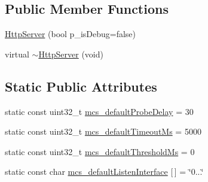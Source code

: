 \subsection*{Public Member Functions}
\begin{DoxyCompactItemize}
\item 
\hyperlink{classxtd_1_1servers_1_1app_1_1HttpServer_a3ebbe8af998a3e3738e41a72375ffea9}{Http\-Server} (bool p\-\_\-is\-Debug=false)
\item 
virtual \hyperlink{classxtd_1_1servers_1_1app_1_1HttpServer_a1082944f193865fc303c2d4a5569eaf9}{$\sim$\-Http\-Server} (void)
\end{DoxyCompactItemize}
\subsection*{Static Public Attributes}
\begin{DoxyCompactItemize}
\item 
static const uint32\-\_\-t \hyperlink{classxtd_1_1servers_1_1app_1_1HttpServer_a9ca36e61f5c201a51a68b3919e0badb7}{mcs\-\_\-default\-Probe\-Delay} = 30
\item 
static const uint32\-\_\-t \hyperlink{classxtd_1_1servers_1_1app_1_1HttpServer_abdc02697ffc7fa9f8f88252101b5d1b9}{mcs\-\_\-default\-Timeout\-Ms} = 5000
\item 
static const uint32\-\_\-t \hyperlink{classxtd_1_1servers_1_1app_1_1HttpServer_ad21741083478d35b92ba0b1da7499950}{mcs\-\_\-default\-Threshold\-Ms} = 0
\item 
static const char \hyperlink{classxtd_1_1servers_1_1app_1_1HttpServer_a38433b4c2d0bba9f0bae81266b42bac1}{mcs\-\_\-default\-Listen\-Interface} \mbox{[}$\,$\mbox{]} = \char`\"{}0...\char`\"{}
\end{DoxyCompactItemize}

